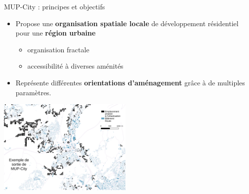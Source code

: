 \documentclass[xcolor=table]{beamer}
\begin{document}
\begin{frame}{MUP-City : principes et objectifs}
	\\
	\begin{itemize}
		\item Propose une \textbf{organisation spatiale locale} de développement résidentiel pour une \textbf{région urbaine}
		\begin{itemize}
			\item<2-> organisation fractale
			\item<3-> accessibilité à diverses aménités %
		\end{itemize}
		\item<4> Représente différentes \textbf{orientations d'aménagement} grâce à de multiples paramètres.
	\end{itemize}
	\includegraphics[width=6.5cm]{Images/ex-sorties-mup.png}
\end{frame}
\end{document}
